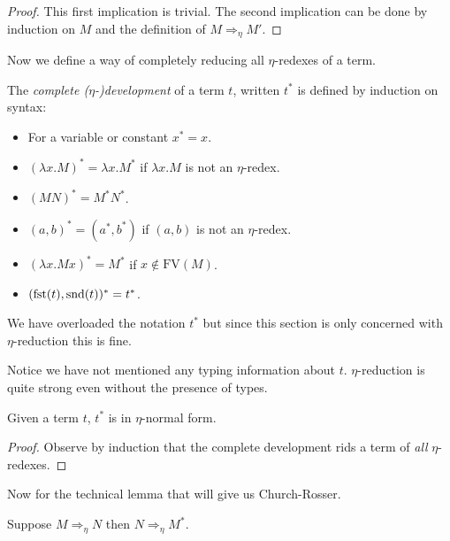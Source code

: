 \begin{proof}
    This first implication is trivial. The second implication can be done by induction on $M$ and the definition of $M \Rightarrow_\eta M'$.
\end{proof}

Now we define a way of completely reducing all $\eta$-redexes of a term.

\begin{defin}
    The \emph{complete ($\eta$-)development} of a term $t$, written $t^*$ is defined by induction on syntax:
    \begin{itemize}
        \item For a variable or constant $x^* = x$.
        \item $(\lambda x . M)^* = \lambda x . M^*$ if $\lambda x . M$ is not an $\eta$-redex.
        \item $(M N)^* = M^* N^*$.
        \item $(a, b)^* = (a^*, b^*)$ if $(a, b)$ is not an $\eta$-redex.
        \item $(\lambda x . M x)^* = M^*$ if $x \not\in \mathrm{FV}(M)$.
        \item $(\mathrm{fst}(t), \mathrm{snd}(t))^* = t^*$.
    \end{itemize}
\end{defin}

\begin{remark}
    We have overloaded the notation $t^*$ but since this section is only concerned with $\eta$-reduction this is fine.
\end{remark}

\begin{remark}
    Notice we have not mentioned any typing information about $t$. $\eta$-reduction is quite strong even without the presence of types.
\end{remark}

\begin{lemma}\label{cd_eta_normal}
    Given a term $t$, $t^*$ is in $\eta$-normal form.
\end{lemma}

\begin{proof}
    Observe by induction that the complete development rids a term of \emph{all} $\eta$-redexes.
\end{proof}

Now for the technical lemma that will give us Church-Rosser.

\begin{lemma}\label{cd_lemma_eta}
    Suppose $M \Rightarrow_\eta N$ then $N \Rightarrow_\eta M^*$.
\end{lemma}

